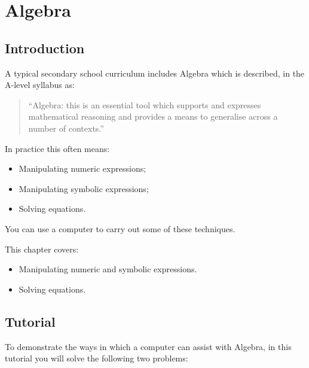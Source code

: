 \chapter{Algebra}
\label{chp:algebra}

\section{Introduction}

A typical secondary school curriculum includes Algebra which
is described, in the A-level syllabus
as:

\begin{quote}
``Algebra: this is an essential tool which supports and expresses mathematical
reasoning and provides a means to generalise across a number of contexts.''
\end{quote}

In practice this often means:
\begin{itemize}
\item Manipulating numeric expressions;
\item Manipulating symbolic expressions;
\item Solving equations.
\end{itemize}


You can use a computer to carry out some of these techniques.

\begin{note}
This chapter covers:

\begin{itemize}
\item Manipulating numeric and symbolic expressions.
\item Solving equations.
\end{itemize}
\end{note}

\section{Tutorial}

To demonstrate the ways in which a computer can assist with Algebra, in this
tutorial you
will solve the following two problems:

